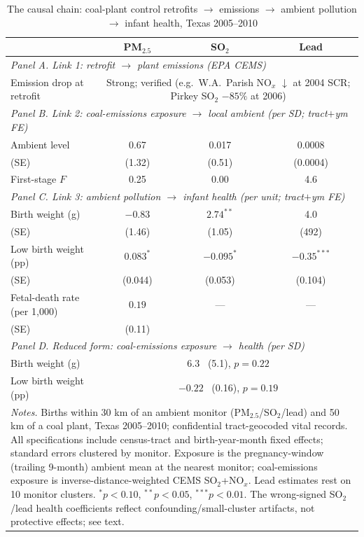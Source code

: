 \begin{table}[htbp]
\centering
\caption{The causal chain: coal-plant control retrofits $\to$ emissions $\to$ ambient pollution $\to$ infant health, Texas 2005--2010}
\label{tab:results_main}
\small
\begin{tabular}{lccc}
\toprule
 & PM$_{2.5}$ & SO$_2$ & Lead \\
\midrule
\multicolumn{4}{l}{\textit{Panel A. Link 1: retrofit $\to$ plant emissions (EPA CEMS)}} \\
\quad Emission drop at retrofit & \multicolumn{3}{c}{Strong; verified (e.g.\ W.A.\ Parish NO$_x$ $\downarrow$ at 2004 SCR; Pirkey SO$_2$ $-85\%$ at 2006)} \\[4pt]
\multicolumn{4}{l}{\textit{Panel B. Link 2: coal-emissions exposure $\to$ local ambient (per SD; tract$+$ym FE)}} \\
\quad Ambient level & 0.67 & 0.017 & 0.0008 \\
\quad \quad (SE) & (1.32) & (0.51) & (0.0004) \\
\quad First-stage $F$ & 0.25 & 0.00 & 4.6 \\[4pt]
\multicolumn{4}{l}{\textit{Panel C. Link 3: ambient pollution $\to$ infant health (per unit; tract$+$ym FE)}} \\
\quad Birth weight (g) & $-0.83$ & $2.74^{**}$ & 4.0 \\
\quad \quad (SE) & (1.46) & (1.05) & (492) \\
\quad Low birth weight (pp) & $0.083^{*}$ & $-0.095^{*}$ & $-0.35^{***}$ \\
\quad \quad (SE) & (0.044) & (0.053) & (0.104) \\
\quad Fetal-death rate (per 1{,}000) & $0.19$ & --- & --- \\
\quad \quad (SE) & (0.11) & & \\[4pt]
\multicolumn{4}{l}{\textit{Panel D. Reduced form: coal-emissions exposure $\to$ health (per SD)}} \\
\quad Birth weight (g) & \multicolumn{3}{c}{$6.3$ \ (5.1), $p=0.22$} \\
\quad Low birth weight (pp) & \multicolumn{3}{c}{$-0.22$ \ (0.16), $p=0.19$} \\
\midrule
\multicolumn{4}{p{0.92\linewidth}}{\footnotesize \textit{Notes.} Births within 30 km of an ambient monitor (PM$_{2.5}$/SO$_2$/lead) and 50 km of a coal plant, Texas 2005--2010; confidential tract-geocoded vital records. All specifications include census-tract and birth-year-month fixed effects; standard errors clustered by monitor. Exposure is the pregnancy-window (trailing 9-month) ambient mean at the nearest monitor; coal-emissions exposure is inverse-distance-weighted CEMS SO$_2$+NO$_x$. Lead estimates rest on 10 monitor clusters. $^{*}p<0.10$, $^{**}p<0.05$, $^{***}p<0.01$. The wrong-signed SO$_2$/lead health coefficients reflect confounding/small-cluster artifacts, not protective effects; see text.} \\
\bottomrule
\end{tabular}
\end{table}

